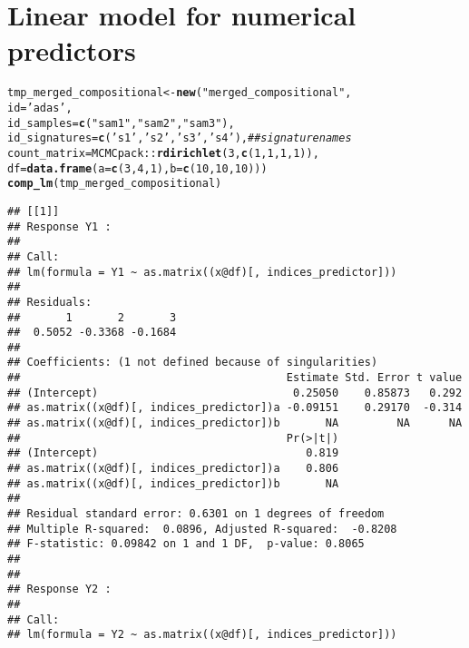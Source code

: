 \documentclass{article}\usepackage[]{graphicx}\usepackage[]{color}
\makeatletter
\newcommand{\hlnum}[1]{\textcolor[rgb]{0.686,0.059,0.569}{#1}}%
\newcommand{\hlstr}[1]{\textcolor[rgb]{0.192,0.494,0.8}{#1}}%
\newcommand{\hlcom}[1]{\textcolor[rgb]{0.678,0.584,0.686}{\textit{#1}}}%
\newcommand{\hlopt}[1]{\textcolor[rgb]{0,0,0}{#1}}%
\newcommand{\hlstd}[1]{\textcolor[rgb]{0.345,0.345,0.345}{#1}}%
\newcommand{\hlkwb}[1]{\textcolor[rgb]{0.69,0.353,0.396}{#1}}%
\newcommand{\hlkwc}[1]{\textcolor[rgb]{0.333,0.667,0.333}{#1}}%
\newcommand{\hlkwd}[1]{\textcolor[rgb]{0.737,0.353,0.396}{\textbf{#1}}}%
\newenvironment{kframe}{%
 \def\at@end@of@kframe{}%
 \ifinner\ifhmode%
  \def\at@end@of@kframe{\end{minipage}}%
  \begin{minipage}{\columnwidth}%
 \fi\fi%
 \def\FrameCommand##1{\hskip\@totalleftmargin \hskip-\fboxsep
 \colorbox{shadecolor}{##1}\hskip-\fboxsep
     \hskip-\linewidth \hskip-\@totalleftmargin \hskip\columnwidth}%
 \MakeFramed {\advance\hsize-\width
   \@totalleftmargin\z@ \linewidth\hsize
   \@setminipage}}%
 {\par\unskip\endMakeFramed%
 \at@end@of@kframe}
\newenvironment{knitrout}{}{} %
\makeatother
\begin{document}
\section{Linear model for numerical predictors}
\begin{knitrout}
\color{fgcolor}\begin{kframe}
\begin{alltt}
\hlstd{tmp_merged_compositional} \hlkwb{<-} \hlkwd{new}\hlstd{(}\hlstr{"merged_compositional"}\hlstd{,}
                                \hlkwc{id}\hlstd{=}\hlstr{'adas'}\hlstd{,}
                                \hlkwc{id_samples}\hlstd{=}\hlkwd{c}\hlstd{(}\hlstr{"sam1"}\hlstd{,} \hlstr{"sam2"}\hlstd{,} \hlstr{"sam3"}\hlstd{),}
                                \hlkwc{id_signatures}\hlstd{=} \hlkwd{c}\hlstd{(}\hlstr{'s1'}\hlstd{,} \hlstr{'s2'}\hlstd{,} \hlstr{'s3'}\hlstd{,} \hlstr{'s4'}\hlstd{),} \hlcom{## signature names}
                                \hlkwc{count_matrix}\hlstd{=MCMCpack}\hlopt{::}\hlkwd{rdirichlet}\hlstd{(}\hlnum{3}\hlstd{,} \hlkwd{c}\hlstd{(}\hlnum{1}\hlstd{,}\hlnum{1}\hlstd{,}\hlnum{1}\hlstd{,}\hlnum{1}\hlstd{)),}
                                \hlkwc{df}\hlstd{=}\hlkwd{data.frame}\hlstd{(}\hlkwc{a}\hlstd{=}\hlkwd{c}\hlstd{(}\hlnum{3}\hlstd{,}\hlnum{4}\hlstd{,}\hlnum{1}\hlstd{),} \hlkwc{b}\hlstd{=}\hlkwd{c}\hlstd{(}\hlnum{10}\hlstd{,} \hlnum{10}\hlstd{,} \hlnum{10}\hlstd{)))}
\hlkwd{comp_lm}\hlstd{(tmp_merged_compositional)}
\end{alltt}
\begin{verbatim}
## [[1]]
## Response Y1 :
## 
## Call:
## lm(formula = Y1 ~ as.matrix((x@df)[, indices_predictor]))
## 
## Residuals:
##       1       2       3 
##  0.5052 -0.3368 -0.1684 
## 
## Coefficients: (1 not defined because of singularities)
##                                         Estimate Std. Error t value
## (Intercept)                              0.25050    0.85873   0.292
## as.matrix((x@df)[, indices_predictor])a -0.09151    0.29170  -0.314
## as.matrix((x@df)[, indices_predictor])b       NA         NA      NA
##                                         Pr(>|t|)
## (Intercept)                                0.819
## as.matrix((x@df)[, indices_predictor])a    0.806
## as.matrix((x@df)[, indices_predictor])b       NA
## 
## Residual standard error: 0.6301 on 1 degrees of freedom
## Multiple R-squared:  0.0896,	Adjusted R-squared:  -0.8208 
## F-statistic: 0.09842 on 1 and 1 DF,  p-value: 0.8065
## 
## 
## Response Y2 :
## 
## Call:
## lm(formula = Y2 ~ as.matrix((x@df)[, indices_predictor]))

\end{verbatim}
\end{kframe}
\end{knitrout}
\end{document}
